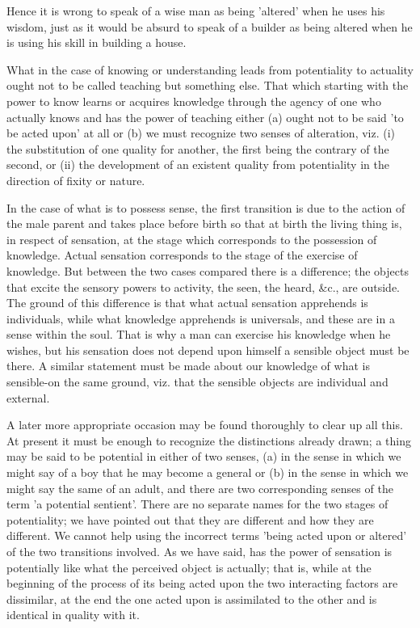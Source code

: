 Hence it is wrong to speak of a wise man as being 'altered' when he
uses his wisdom, just as it would be absurd to speak of a builder
as being altered when he is using his skill in building a house.

What in the case of knowing or understanding leads from potentiality
to actuality ought not to be called teaching but something else. That
which starting with the power to know learns or acquires knowledge
through the agency of one who actually knows and has the power of
teaching either (a) ought not to be said 'to be acted upon' at all
or (b) we must recognize two senses of alteration, viz. (i) the substitution
of one quality for another, the first being the contrary of the second,
or (ii) the development of an existent quality from potentiality in
the direction of fixity or nature. 

In the case of what is to possess sense, the first transition is due
to the action of the male parent and takes place before birth so that
at birth the living thing is, in respect of sensation, at the stage
which corresponds to the possession of knowledge. Actual sensation
corresponds to the stage of the exercise of knowledge. But between
the two cases compared there is a difference; the objects that excite
the sensory powers to activity, the seen, the heard, &c., are outside.
The ground of this difference is that what actual sensation apprehends
is individuals, while what knowledge apprehends is universals, and
these are in a sense within the soul. That is why a man can exercise
his knowledge when he wishes, but his sensation does not depend upon
himself a sensible object must be there. A similar statement must
be made about our knowledge of what is sensible-on the same ground,
viz. that the sensible objects are individual and external.

A later more appropriate occasion may be found thoroughly to clear
up all this. At present it must be enough to recognize the distinctions
already drawn; a thing may be said to be potential in either of two
senses, (a) in the sense in which we might say of a boy that he may
become a general or (b) in the sense in which we might say the same
of an adult, and there are two corresponding senses of the term 'a
potential sentient'. There are no separate names for the two stages
of potentiality; we have pointed out that they are different and how
they are different. We cannot help using the incorrect terms 'being
acted upon or altered' of the two transitions involved. As we have
said, has the power of sensation is potentially like what the perceived
object is actually; that is, while at the beginning of the process
of its being acted upon the two interacting factors are dissimilar,
at the end the one acted upon is assimilated to the other and is identical
in quality with it. 

